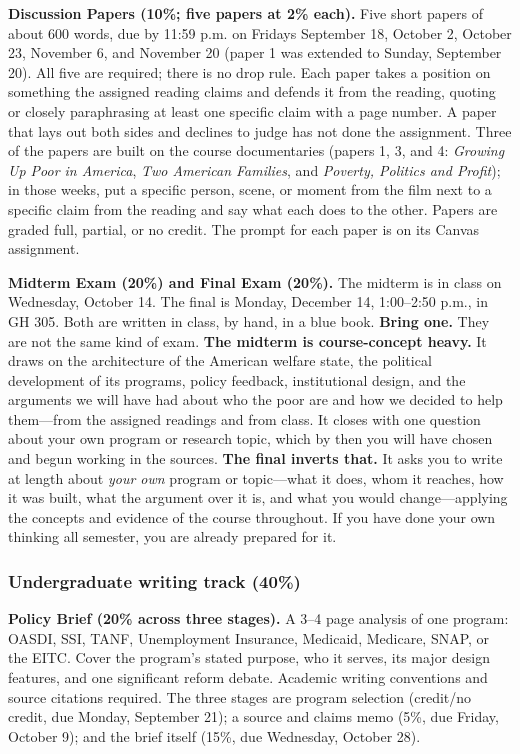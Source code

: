 \documentclass[12pt]{article}
\begin{document}
\vspace{0.5em}
\noindent \textbf{Discussion Papers (10\%; five papers at 2\% each).} Five short papers of about 600 words, due by 11:59 p.m. on Fridays September 18, October 2, October 23, November 6, and November 20 (paper 1 was extended to Sunday, September 20). All five are required; there is no drop rule. Each paper takes a position on something the assigned reading claims and defends it from the reading, quoting or closely paraphrasing at least one specific claim with a page number. A paper that lays out both sides and declines to judge has not done the assignment. Three of the papers are built on the course documentaries (papers 1, 3, and 4: \emph{Growing Up Poor in America}, \emph{Two American Families}, and \emph{Poverty, Politics and Profit}); in those weeks, put a specific person, scene, or moment from the film next to a specific claim from the reading and say what each does to the other. Papers are graded full, partial, or no credit. The prompt for each paper is on its Canvas assignment.

\vspace{0.5em}
\noindent \textbf{Midterm Exam (20\%) and Final Exam (20\%).} The midterm is in class on Wednesday, October 14. The final is Monday, December 14, 1:00--2:50 p.m., in GH 305. Both are written in class, by hand, in a blue book. \textbf{Bring one.} They are not the same kind of exam. \textbf{The midterm is course-concept heavy.} It draws on the architecture of the American welfare state, the political development of its programs, policy feedback, institutional design, and the arguments we will have had about who the poor are and how we decided to help them---from the assigned readings and from class. It closes with one question about your own program or research topic, which by then you will have chosen and begun working in the sources. \textbf{The final inverts that.} It asks you to write at length about \emph{your own} program or topic---what it does, whom it reaches, how it was built, what the argument over it is, and what you would change---applying the concepts and evidence of the course throughout. If you have done your own thinking all semester, you are already prepared for it.

\subsubsection*{Undergraduate writing track (40\%)}

\noindent \textbf{Policy Brief (20\% across three stages).} A 3--4 page analysis of one program: OASDI, SSI, TANF, Unemployment Insurance, Medicaid, Medicare, SNAP, or the EITC. Cover the program's stated purpose, who it serves, its major design features, and one significant reform debate. Academic writing conventions and source citations required. The three stages are program selection (credit/no credit, due Monday, September 21); a source and claims memo (5\%, due Friday, October 9); and the brief itself (15\%, due Wednesday, October 28).
\end{document}
